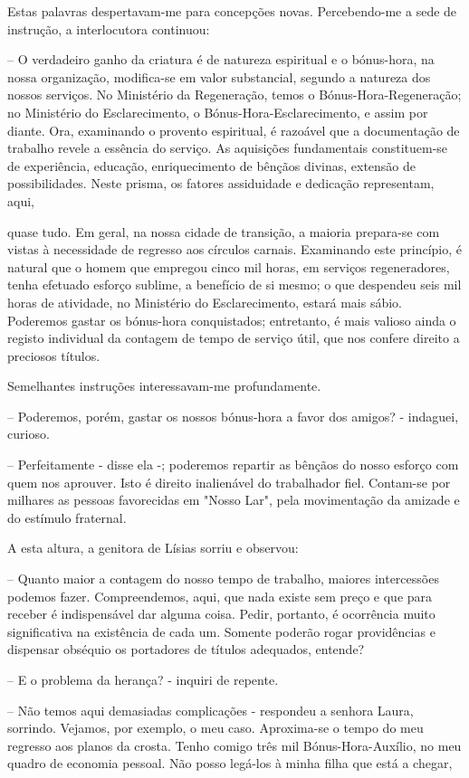 \documentclass[portuguese,12pt,a4paper]{scrbook}
\begin{document}
	Estas palavras despertavam-me para concepções novas. Percebendo-me a sede de instrução, a interlocutora continuou:
	
	– O verdadeiro ganho da criatura é de natureza espiritual e o bónus-hora, na nossa organização, modifica-se em valor substancial, segundo a natureza dos nossos serviços. No Ministério da Regeneração, temos o Bónus-Hora-Regeneração; no Ministério do Esclarecimento, o Bónus-Hora-Esclarecimento, e assim por diante. Ora, examinando o provento espiritual, é razoável que a documentação de trabalho revele a essência do serviço. As aquisições fundamentais constituem-se de experiência, educação, enriquecimento de bênçãos divinas, extensão de possibilidades. Neste prisma, os fatores assiduidade e dedicação representam, aqui,
	
	
	quase tudo. Em geral, na nossa cidade de transição, a maioria prepara-se com vistas à necessidade de regresso aos círculos carnais. Examinando este princípio, é natural que o homem que empregou cinco mil horas, em serviços regeneradores, tenha efetuado esforço sublime, a benefício de si mesmo; o que despendeu seis mil horas de atividade, no Ministério do Esclarecimento, estará mais sábio. Poderemos gastar os bónus-hora conquistados; entretanto, é mais valioso ainda o registo individual da contagem de tempo de serviço útil, que nos confere direito a preciosos títulos.
	
	Semelhantes instruções interessavam-me profundamente.
	
	– Poderemos, porém, gastar os nossos bónus-hora a favor dos amigos? - indaguei, curioso.
	
	– Perfeitamente - disse ela -; poderemos repartir as bênçãos do nosso esforço com quem nos aprouver. Isto é direito inalienável do trabalhador fiel. Contam-se por milhares as pessoas favorecidas em "Nosso Lar", pela movimentação da amizade e do estímulo fraternal.
	
	A esta altura, a genitora de Lísias sorriu e observou:
	
	– Quanto maior a contagem do nosso tempo de trabalho, maiores intercessões podemos fazer. Compreendemos, aqui, que nada existe sem preço e que para receber é indispensável dar alguma coisa. Pedir, portanto, é ocorrência muito significativa na existência de cada um. Somente poderão rogar providências e dispensar obséquio os portadores de títulos adequados, entende?
	
	– E o problema da herança? - inquiri de repente.
	
	– Não temos aqui demasiadas complicações - respondeu a senhora Laura, sorrindo. Vejamos, por exemplo, o meu caso. Aproxima-se o tempo do meu regresso aos planos da crosta. Tenho comigo três mil Bónus-Hora-Auxílio, no meu quadro de economia pessoal. Não posso legá-los à minha filha que está a chegar,
	
\end{document}
